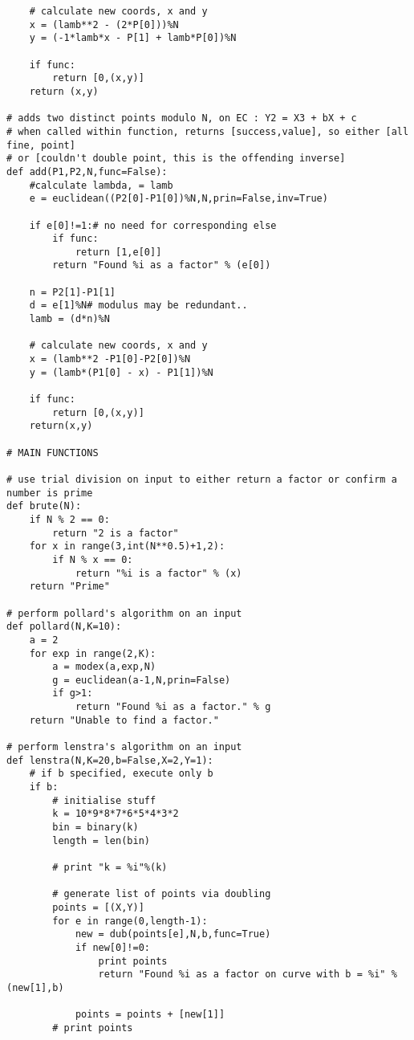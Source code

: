 \begin{verbatim}
    # calculate new coords, x and y
    x = (lamb**2 - (2*P[0]))%N
    y = (-1*lamb*x - P[1] + lamb*P[0])%N
    
    if func:
        return [0,(x,y)]
    return (x,y)

# adds two distinct points modulo N, on EC : Y2 = X3 + bX + c
# when called within function, returns [success,value], so either [all fine, point]
# or [couldn't double point, this is the offending inverse]
def add(P1,P2,N,func=False):
    #calculate lambda, = lamb
    e = euclidean((P2[0]-P1[0])%N,N,prin=False,inv=True)

    if e[0]!=1:# no need for corresponding else
        if func:
            return [1,e[0]]
        return "Found %i as a factor" % (e[0])

    n = P2[1]-P1[1]
    d = e[1]%N# modulus may be redundant..
    lamb = (d*n)%N

    # calculate new coords, x and y
    x = (lamb**2 -P1[0]-P2[0])%N
    y = (lamb*(P1[0] - x) - P1[1])%N

    if func:
        return [0,(x,y)]
    return(x,y)

# MAIN FUNCTIONS

# use trial division on input to either return a factor or confirm a number is prime
def brute(N):
    if N % 2 == 0:
        return "2 is a factor"
    for x in range(3,int(N**0.5)+1,2):
        if N % x == 0:
            return "%i is a factor" % (x)
    return "Prime"

# perform pollard's algorithm on an input
def pollard(N,K=10):
    a = 2
    for exp in range(2,K):
        a = modex(a,exp,N)
        g = euclidean(a-1,N,prin=False)
        if g>1:
            return "Found %i as a factor." % g
    return "Unable to find a factor."

# perform lenstra's algorithm on an input
def lenstra(N,K=20,b=False,X=2,Y=1):
    # if b specified, execute only b
    if b:
        # initialise stuff
        k = 10*9*8*7*6*5*4*3*2
        bin = binary(k)
        length = len(bin)

        # print "k = %i"%(k)

        # generate list of points via doubling
        points = [(X,Y)]
        for e in range(0,length-1):
            new = dub(points[e],N,b,func=True)
            if new[0]!=0:
                print points
                return "Found %i as a factor on curve with b = %i" % (new[1],b)

            points = points + [new[1]]
        # print points


\end{verbatim}
